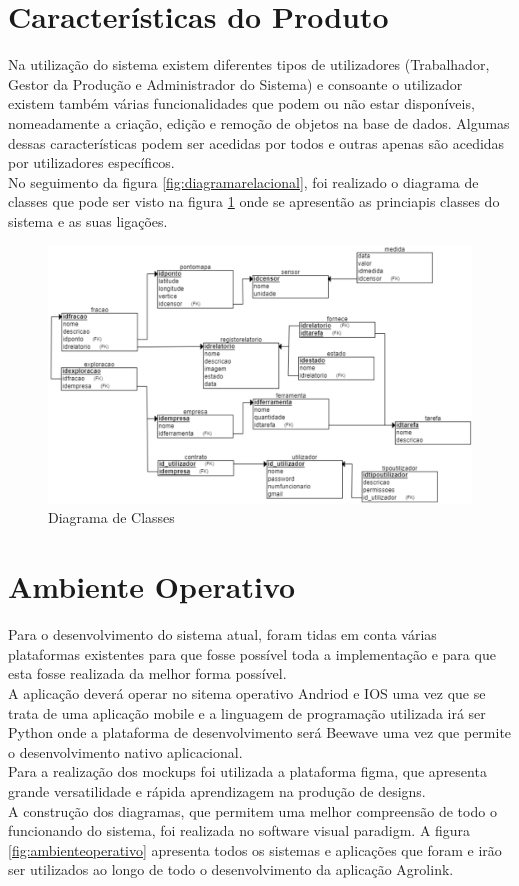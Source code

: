 \documentclass{scrreprt}
\begin{document}
		
	\section{Características do Produto}
	Na utilização do sistema existem diferentes tipos de utilizadores (Trabalhador, Gestor da Produção e Administrador do Sistema) e consoante o utilizador existem também várias funcionalidades que podem ou não estar disponíveis, nomeadamente a criação, edição e remoção de objetos na base de dados. Algumas dessas características podem ser acedidas por todos e outras apenas são acedidas por utilizadores específicos.\\
	No seguimento da figura \ref{fig:diagramarelacional}, foi realizado o diagrama de classes que pode ser visto na figura \ref{fig:diagramadeclasses} onde se apresentão as princiapis classes do sistema e as suas ligações. 
	
	\begin{figure}[!h]
		\centering
		\includegraphics[width=0.7\linewidth]{DiagramaDeClasses.png}
		\caption{Diagrama de Classes}			\label{fig:diagramadeclasses}
	\end{figure}

	
	\section{Ambiente Operativo}
	
	Para o desenvolvimento do sistema atual, foram tidas em conta várias 
	plataformas existentes para que fosse possível toda a implementação e para que esta fosse realizada da melhor forma possível.
	\\ A aplicação deverá operar no sitema operativo Andriod e IOS uma vez que se trata de uma aplicação mobile e a linguagem de programação utilizada irá ser Python onde a plataforma de desenvolvimento será Beewave uma vez que permite o desenvolvimento nativo aplicacional. 
	\\Para a realização dos mockups foi utilizada a plataforma figma, que apresenta grande versatilidade e rápida aprendizagem na produção de designs.
	\\A construção dos diagramas, que permitem uma melhor compreensão de todo o funcionando do sistema, foi realizada no software visual paradigm. A figura \ref{fig:ambienteoperativo} apresenta todos os sistemas e aplicações que foram e irão ser utilizados ao longo de todo o desenvolvimento da aplicação Agrolink.
	
\end{document}

